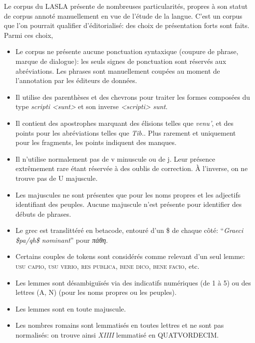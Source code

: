 Le corpus du LASLA présente de nombreuses particularités, propres à son statut de corpus annoté manuellement en vue de l'étude de la langue. C'est un corpus que l'on pourrait qualifier d'éditorialisé: des choix de présentation forts sont faits. Parmi ces choix, 
\begin{itemize}
    \item Le corpus ne présente aucune ponctuation syntaxique (coupure de phrase, marque de dialogue): les seuls signes de ponctuation sont réservés aux abréviations. Les phrases sont manuellement coupées au moment de l'annotation par les éditeurs de données. 
    \item Il utilise des parenthèses et des chevrons pour traiter les formes composées du type \textit{scripti <sunt>} et son inverse \textit{<scripti> sunt}.
    \item Il contient des apostrophes marquant des élisions  telles que \textit{venu'}, et des points pour les abréviations telles que \textit{Tib.}. Plus rarement et uniquement pour les fragments, les points indiquent des manques.
    \item Il n'utilise normalement pas de v minuscule ou de j. Leur présence extrêmement rare étant réservée à des oublis de correction. À l'inverse, on ne trouve pas de U majuscule.
    \item Les majuscules ne sont présentes que pour les noms propres et les adjectifs identifiant des peuples. Aucune majuscule n'est présente pour identifier des débuts de phrases.
    \item Le grec est translittéré en betacode, entouré d'un \$ de chaque côté: \enquote{\textit{Graeci \$pa/qh\$ nominant}} pour \textit{πάθη}.
    \item Certains couples de tokens sont considérés comme relevant d'un seul lemme: \textsc{usu capio}, \textsc{usu verio}, \textsc{res publica}, \textsc{bene dico}, \textsc{bene facio}, etc.
    \item Les lemmes sont désambiguïsés via des indicatifs numériques (de 1 à 5) ou des lettres (A, N) (pour les noms propres ou les peuples).
    \item Les lemmes sont en toute majuscule.
    \item Les nombres romains sont lemmatisés en toutes lettres et ne sont pas normalisés: on trouve ainsi \textit{XIIII} lemmatisé en \textsc{QUATVORDECIM}.
\end{itemize}
